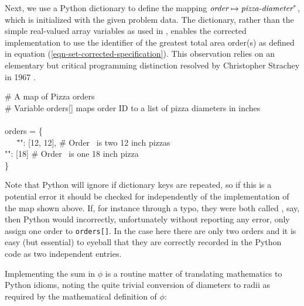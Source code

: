 \documentclass[11pt]{article}
\begin{document}
Next, we use a Python dictionary to define the mapping $\mbox{\it order} \mapsto \mbox{\it pizza-diameter}^{*}$, which is initialized with the given problem data. The dictionary, rather than the simple real-valued array variables as used in \cite{pizzap}, enables the corrected implementation to use the identifier of the greatest total area order(s) as defined in equation (\ref{eqn-set-corrected-specification}). This observation relies on an elementary but critical programming distinction resolved by Christopher Strachey in 1967 \cite{strachey}.

{\tt\begin{tabbing}
\# A map of Pizza orders\\
\# Variable orders[] maps order ID to a list of pizza diameters in inches\\ \\
orders = \{\\
\ \ \ \="\orderA": [12, 12], \=\# Order \orderA\ is two 12 inch pizzas\\
   \>"\orderB": [18] \>\# Order \orderB\ is one 18 inch pizza\\
\}
\end{tabbing}}

Note that Python will ignore if dictionary keys are repeated, so if this is a potential error it should be checked for independently of the implementation of the map shown above. If, for instance through a typo, they were both called \orderA, say, then Python would incorrectly, unfortunately without reporting any error, only assign one order to \texttt{orders[]}. In the case here there are only two orders and it is easy (but essential) to eyeball that they are correctly recorded in the Python code as two independent entries. 

Implementing the sum in $\phi$ is a routine matter of translating mathematics to Python idioms, noting the quite trivial conversion of diameters to radii as required by the mathematical definition of $\phi$:

{\tt{}}
\end{document}

